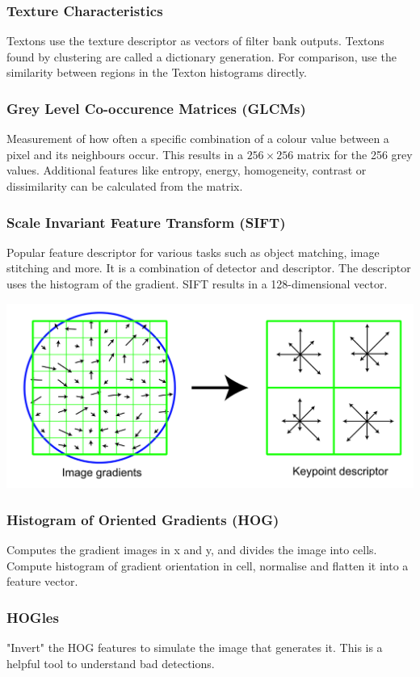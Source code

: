 \documentclass[11pt]{article}
\theoremstyle{definition}
\begin{document}
\subsubsection{Texture Characteristics}
Textons use the texture descriptor as vectors of filter bank outputs. Textons found by clustering are called a dictionary generation. For comparison, use the similarity between regions in the Texton histograms directly.

\subsubsection{Grey Level Co-occurence Matrices (GLCMs)}
Measurement of how often a specific combination of a colour value between a pixel and its neighbours occur. This results in a $256\times 256$ matrix for the 256 grey values. Additional features like entropy, energy, homogeneity, contrast or dissimilarity can be calculated from the matrix.

\subsubsection{Scale Invariant Feature Transform (SIFT)}
Popular feature descriptor for various tasks such as object matching, image stitching and more. It is a combination of detector and descriptor. The descriptor uses the histogram of the gradient. SIFT results in a 128-dimensional vector.
\begin{center}
	\includegraphics[width=0.6\linewidth]{img/SIFT}
\end{center}

\subsubsection{Histogram of Oriented Gradients (HOG)}
Computes the gradient images in x and y, and divides the image into cells. Compute histogram of gradient orientation in cell, normalise and flatten it into a feature vector.

\subsubsection{HOGles}
"Invert" the HOG features to simulate the image that generates it. This is a helpful tool to understand bad detections.
\end{document}
